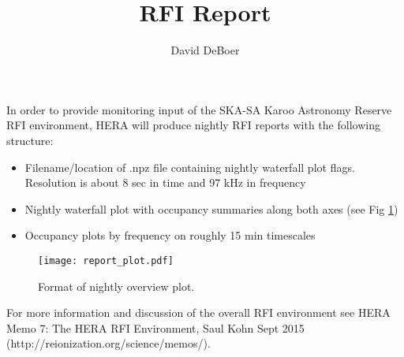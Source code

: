 \documentclass{article}
\begin{document}
\author{David DeBoer}
\title{RFI Report}
\maketitle

In order to provide monitoring input of the SKA-SA Karoo Astronomy Reserve RFI environment, HERA will produce nightly RFI reports with the following structure:

\begin{itemize}
\item Filename/location of .npz file containing nightly waterfall plot flags.  Resolution is about 8 sec in time and 97 kHz in frequency
\item Nightly waterfall plot with occupancy summaries along both axes (see Fig \ref{fig:occ})
\item Occupancy plots by frequency on roughly 15 min timescales
\end{itemize}

\begin{figure}[H]
\texttt{[image: report\_plot.pdf]}
\centering
\caption{Format of nightly overview plot.}
\label{fig:occ}
\end{figure}

For more information and discussion of the overall RFI environment see HERA Memo 7:  The HERA RFI Environment, Saul Kohn Sept 2015 (http://reionization.org/science/memos/).
\end{document}
